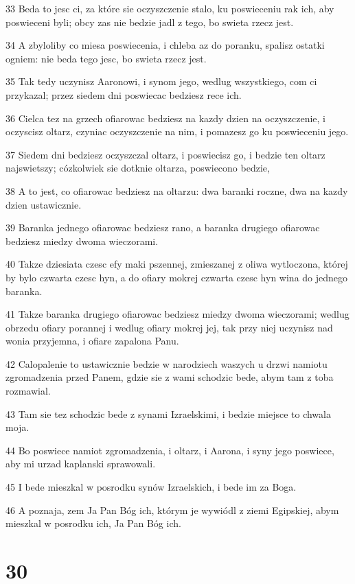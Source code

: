 \par 33 Beda to jesc ci, za które sie oczyszczenie stalo, ku poswieceniu rak ich, aby poswieceni byli; obcy zas nie bedzie jadl z tego, bo swieta rzecz jest.
\par 34 A zbyloliby co miesa poswiecenia, i chleba az do poranku, spalisz ostatki ogniem: nie beda tego jesc, bo swieta rzecz jest.
\par 35 Tak tedy uczynisz Aaronowi, i synom jego, wedlug wszystkiego, com ci przykazal; przez siedem dni poswiecac bedziesz rece ich.
\par 36 Cielca tez na grzech ofiarowac bedziesz na kazdy dzien na oczyszczenie, i oczyscisz oltarz, czyniac oczyszczenie na nim, i pomazesz go ku poswieceniu jego.
\par 37 Siedem dni bedziesz oczyszczal oltarz, i poswiecisz go, i bedzie ten oltarz najswietszy; cózkolwiek sie dotknie oltarza, poswiecono bedzie,
\par 38 A to jest, co ofiarowac bedziesz na oltarzu: dwa baranki roczne, dwa na kazdy dzien ustawicznie.
\par 39 Baranka jednego ofiarowac bedziesz rano, a baranka drugiego ofiarowac bedziesz miedzy dwoma wieczorami.
\par 40 Takze dziesiata czesc efy maki pszennej, zmieszanej z oliwa wytloczona, której by bylo czwarta czesc hyn, a do ofiary mokrej czwarta czesc hyn wina do jednego baranka.
\par 41 Takze baranka drugiego ofiarowac bedziesz miedzy dwoma wieczorami; wedlug obrzedu ofiary porannej i wedlug ofiary mokrej jej, tak przy niej uczynisz nad wonia przyjemna, i ofiare zapalona Panu.
\par 42 Calopalenie to ustawicznie bedzie w narodziech waszych u drzwi namiotu zgromadzenia przed Panem, gdzie sie z wami schodzic bede, abym tam z toba rozmawial.
\par 43 Tam sie tez schodzic bede z synami Izraelskimi, i bedzie miejsce to chwala moja.
\par 44 Bo poswiece namiot zgromadzenia, i oltarz, i Aarona, i syny jego poswiece, aby mi urzad kaplanski sprawowali.
\par 45 I bede mieszkal w posrodku synów Izraelskich, i bede im za Boga.
\par 46 A poznaja, zem Ja Pan Bóg ich, którym je wywiódl z ziemi Egipskiej, abym mieszkal w posrodku ich, Ja Pan Bóg ich.

\chapter{30}


